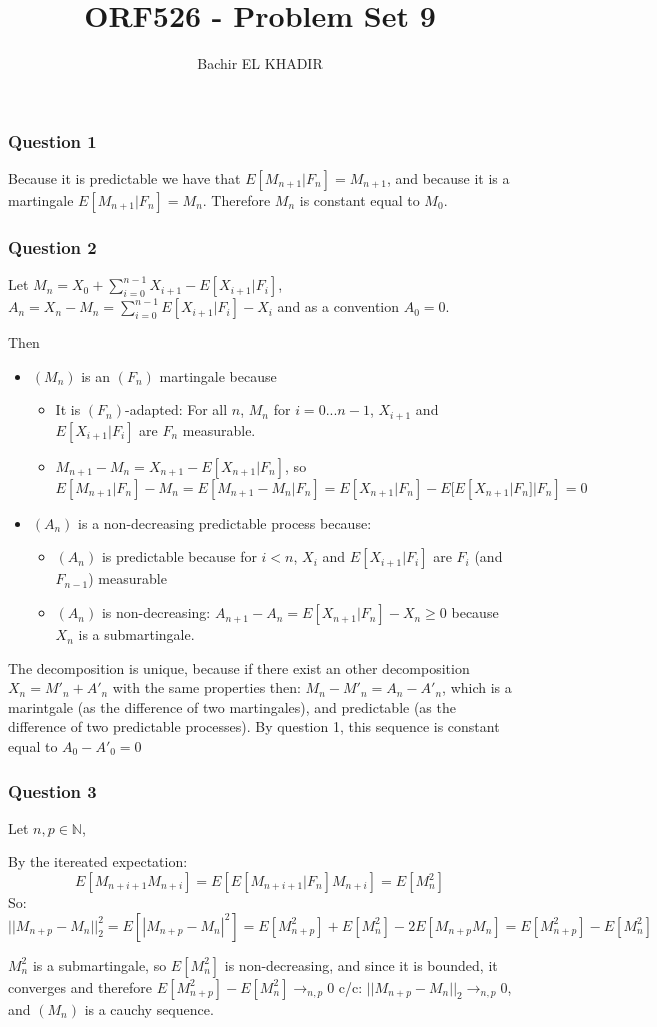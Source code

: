 \documentclass[12pt]{article}
\title{ORF526 - Problem Set 9}
\author{Bachir EL KHADIR }
\newcommand{\Q}[1]{\subsubsection*{Question #1}}
\begin{document}
\maketitle

\Q{1}
Because it is predictable we have that $E[M_{n+1}|F_n] = M_{n+1}$, and because it is a martingale $E[M_{n+1}|F_n] = M_n$. Therefore $M_n$ is constant equal to $M_0$.

\Q{2}
Let $M_n = X_0 + \sum_{i=0}^{n-1} X_{i+1} - E[X_{i+1}|F_i]$, $A_n = X_n - M_n = \sum_{i=0}^{n-1}E[X_{i+1}|F_i] - X_i$ and as a convention $A_0 = 0$.

Then

\begin{itemize}
\item $(M_n)$ is an $(F_n)$ martingale because
  \begin{itemize}
  \item It is $(F_n)$-adapted: For all $n$, $M_n$ for $i = 0... n-1$, $X_{i+1}$ and $E[X_{i+1}|F_i]$ are $F_n$ measurable.
  \item $M_{n+1} - M_n = X_{n+1} - E[X_{n+1} | F_n]$, so $$E[M_{n+1}|F_n] - M_n = E[M_{n+1} - M_n | F_n] = E[X_{n+1}|F_n] - E[E[X_{n+1} | F_n]|F_n] = 0$$
  \end{itemize}
\item $(A_n)$ is a non-decreasing predictable process because:
  \begin{itemize}
  \item $(A_n)$ is predictable because for $i < n$, $X_i$ and $E[X_{i+1}|F_i]$ are $F_i$ (and $F_{n-1}$) measurable
  \item $(A_n)$ is non-decreasing: $A_{n+1} - A_n = E[X_{n+1}|F_n] - X_n \ge 0$ because $X_n$ is a submartingale.
  \end{itemize}
\end{itemize}
The decomposition is unique, because if there exist an other decomposition $X_n = M'_n + A'_n$ with the same properties then:
$M_n - M'_n = A_n - A'_n$, which is a marintgale (as the difference of two martingales), and predictable (as the difference of two predictable processes). By question 1, this sequence is constant equal to $A_0 - A'_0 = 0$

\Q{3}
Let $n, p \in \mathbb{N}$,

By the itereated expectation: $$E[M_{n+i+1}M_{n+i}] = E[E[M_{n+i+1}|F_n]M_{n+i}] = E[M_n^2]$$
So:
$$||M_{n+p} - M_{n}||_2^2 = E[|M_{n+p} - M_n|^2] = E[M_{n+p}^2] + E[M_n^2] - 2 E[M_{n+p}M_n] = E[M_{n+p}^2] - E[M_{n}^2]$$

$M_n^2$ is a submartingale, so $E[M_n^2]$ is non-decreasing, and since it is bounded, it converges and therefore $E[M_{n+p}^2] - E[M_{n}^2] \rightarrow_{n,p} 0$
c/c: $||M_{n+p} - M_{n}||_2 \rightarrow_{n,p} 0$, and $(M_n)$ is a cauchy sequence.
\end{document}
